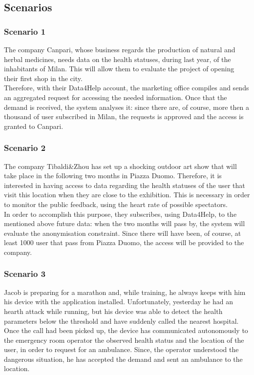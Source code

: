 \subsection{Scenarios}

\subsubsection{Scenario 1}
The company Canpari, whose business regards the production of natural and herbal medicines, needs data on the health statuses, during last year, of the inhabitants of Milan. This will allow them to evaluate the project of opening their first shop in the city. \\
Therefore, with their Data4Help account, the marketing office compiles and sends an aggregated request for accessing the needed information. 
Once that the demand is received, the system analyses it: since there are, of course, more then a thousand of user subscribed in Milan, the requests is approved and the access is granted to Canpari. 

\subsubsection{Scenario 2}
The company Tibaldi\&Zhou has set up a shocking outdoor art show that will take place in the following two months in Piazza Duomo.
Therefore, it is interested in having access to data regarding the health statuses of the user that visit this location when they are close to the exhibition.
This is necessary in order to monitor the public feedback, using the heart rate of possible spectators. \\
In order to accomplish this purpose, they subscribes, using Data4Help, to the mentioned above future data: when the two months will pass by, the system will evaluate the anonymisation constraint. Since there will have been, of course, at least 1000 user that pass from Piazza Duomo, the access will be provided to the company. 

\subsubsection{Scenario 3}
Jacob is preparing for a marathon and, while training, he always keeps with him his device with the application installed. 
Unfortunately, yesterday he had an hearth attack while running, but his device was able to detect the health parameters below the threshold and have suddenly called the nearest hospital. \\
Once the call had been picked up, the device has communicated autonomously to the emergency room operator the observed health status and the location of the user, in order to request for an ambulance. 
Since, the operator understood the dangerous situation, he has accepted the demand and sent an ambulance to the location.

